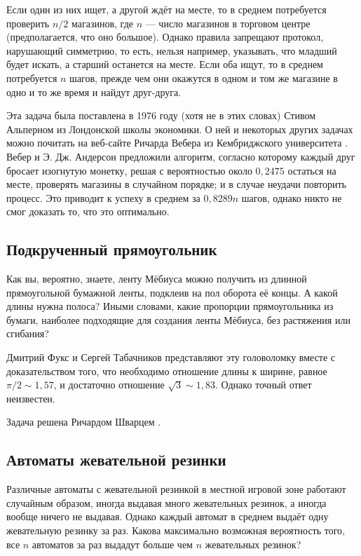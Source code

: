 Если один из них ищет, а другой ждёт на месте, то в среднем потребуется проверить $n/2$ магазинов, где $n$ --- число магазинов в торговом центре (предполагается, что оно большое).
Однако правила запрещают протокол, нарушающий симметрию, то есть, нельзя например, указывать, что младший будет искать, а старший останется на месте.
Если оба ищут, то в среднем потребуется $n$ шагов, прежде чем они окажутся в одном и том же магазине в одно и то же время и найдут друг-друга.

Эта задача была поставлена в 1976 году (хотя не в этих словах) Стивом Альперном из Лондонской школы экономики.
О ней и некоторых других задачах можно почитать на веб-сайте Ричарда Вебера из Кембриджского университета \cite{weber}.
Вебер и Э. Дж. Андерсон предложили алгоритм, согласно которому каждый друг бросает изогнутую монетку, решая с вероятностью около $0{,}2475$ остаться на месте, проверять магазины в случайном порядке;
и в случае неудачи повторить процесс.
Это приводит к успеху в среднем за $0{,}8289n$ шагов, однако никто не смог доказать то, что это оптимально.

\subsection*{Подкрученный прямоугольник}

Как вы, вероятно, знаете, ленту Мёбиуса можно получить из длинной прямоугольной бумажной ленты,
подклеив на пол оборота её концы.
А какой длины нужна полоса?
Иными словами, какие пропорции прямоугольника из бумаги, наиболее подходящие для создания ленты Мёбиуса, без растяжения или сгибания?

Дмитрий Фукс и Сергей Табачников представляют эту головоломку \cite[Лекция 14]{19} вместе с доказательством того, что необходимо отношение длины к ширине, равное $\pi/2 \sim 1{,}57$, и достаточно отношение $\sqrt{3} \sim 1{,}83$.
Однако точный ответ неизвестен.

\begin{addedbytheeditors}
Задача решена Ричардом Шварцем \cite{schwartz}.
\end{addedbytheeditors}


\subsection*{Автоматы жевательной резинки}

Различные автоматы с жевательной резинкой в местной игровой зоне работают случайным образом, иногда выдавая много жевательных резинок, а иногда вообще ничего не выдавая.
Однако каждый автомат в среднем выдаёт одну жевательную резинку за раз.
Какова максимально возможная вероятность того, все $n$ автоматов за раз выдадут больше чем $n$ жевательных резинок?

